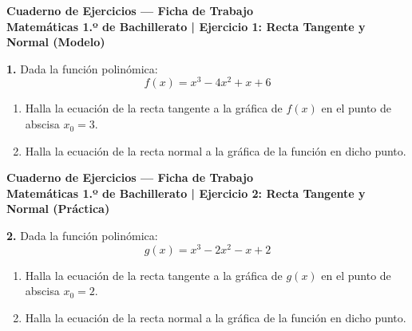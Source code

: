 \documentclass[11pt,a4paper]{article}
\begin{document}
\pagestyle{empty}

\begin{center}
    {\LARGE \textbf{Cuaderno de Ejercicios — Ficha de Trabajo}}\\[4pt]
    {\large \textbf{Matemáticas 1.º de Bachillerato | Ejercicio 1: Recta Tangente y Normal (Modelo)}}
\end{center}

\vspace{0.8cm}
\noindent\textbf{1.} Dada la función polinómica:
\[
f(x) = x^3 - 4x^2 + x + 6
\]

\begin{enumerate}[label=\textbf{\alph*)}, leftmargin=2em, itemsep=12pt]
    \item Halla la ecuación de la recta tangente a la gráfica de $f(x)$ en el punto de abscisa $x_0 = 3$.
    \item Halla la ecuación de la recta normal a la gráfica de la función en dicho punto.
\end{enumerate}

\newpage

\begin{center}
    {\LARGE \textbf{Cuaderno de Ejercicios — Ficha de Trabajo}}\\[4pt]
    {\large \textbf{Matemáticas 1.º de Bachillerato | Ejercicio 2: Recta Tangente y Normal (Práctica)}}
\end{center}

\vspace{0.8cm}
\noindent\textbf{2.} Dada la función polinómica:
\[
g(x) = x^3 - 2x^2 - x + 2
\]

\begin{enumerate}[label=\textbf{\alph*)}, leftmargin=2em, itemsep=12pt]
    \item Halla la ecuación de la recta tangente a la gráfica de $g(x)$ en el punto de abscisa $x_0 = 2$.
    \item Halla la ecuación de la recta normal a la gráfica de la función en dicho punto.
\end{enumerate}

\newpage
\end{document}

